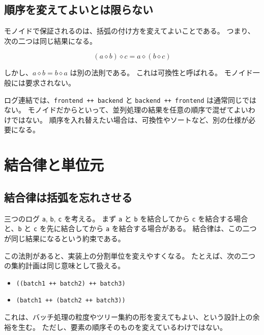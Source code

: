 \subsection{順序を変えてよいとは限らない}

モノイドで保証されるのは、括弧の付け方を変えてよいことである。
つまり、次の二つは同じ結果になる。

\[
  (a \diamond b) \diamond c
  =
  a \diamond (b \diamond c)
\]

しかし、\(a \diamond b = b \diamond a\) は別の法則である。
これは可換性と呼ばれる。
モノイド一般には要求されない。

\begin{warningbox}
ログ連結では、\texttt{frontend ++ backend} と \texttt{backend ++ frontend} は通常同じではない。
モノイドだからといって、並列処理の結果を任意の順序で混ぜてよいわけではない。
順序を入れ替えたい場合は、可換性やソートなど、別の仕様が必要になる。
\end{warningbox}

\section{結合律と単位元}

\subsection{結合律は括弧を忘れさせる}

三つのログ \texttt{a}, \texttt{b}, \texttt{c} を考える。
まず \texttt{a} と \texttt{b} を結合してから \texttt{c} を結合する場合と、\texttt{b} と \texttt{c} を先に結合してから \texttt{a} を結合する場合がある。
結合律は、この二つが同じ結果になるという約束である。


この法則があると、実装上の分割単位を変えやすくなる。
たとえば、次の二つの集約計画は同じ意味として扱える。

\begin{itemize}
\item \texttt{((batch1 ++ batch2) ++ batch3)}
\item \texttt{(batch1 ++ (batch2 ++ batch3))}
\end{itemize}

これは、バッチ処理の粒度やツリー集約の形を変えてもよい、という設計上の余裕を生む。
ただし、要素の順序そのものを変えているわけではない。

